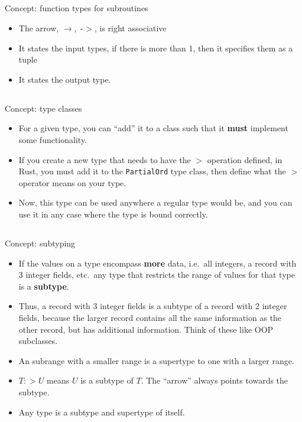 \subsection{}
Concept: function types for subroutines

\begin{itemize}[noitemsep]
\item The arrow, $\rightarrow$, \texttt{-$>$}, is right associative
\item It states the input types, if there is more than 1, then it specifies them as a tuple
\item It states the output type.
\end{itemize}

\subsection{}\label{subsec:Type_Classes}
Concept: type classes

\begin{itemize}[noitemsep]
\item For a given type, you can ``add'' it to a class such that it \textbf{must} implement some functionality.
\item If you create a new type that needs to have the $>$ operation defined, in Rust, you must add it to the \texttt{PartialOrd} type class, then define what the $>$ operator means on your type.
\item Now, this type can be used anywhere a regular type would be, and you can use it in any case where the type is bound correctly.
\end{itemize}

\subsection{}
Concept: subtyping

\begin{itemize}[noitemsep]
\item If the values on a type encompass \textbf{more} data, i.e.\ all integers, a record with 3 integer fields, etc.\ any type that restricts the range of values for that type is a \textbf{subtype}.
\item Thus, a record with 3 integer fields is a subtype of a record with 2 integer fields, because the larger record contains all the same information as the other record, but has additional information. Think of these like OOP subclasses.
\item An subrange with a smaller range is a supertype to one with a larger range.
\item $T :> U$ means $U$ is a subtype of $T$. The ``arrow'' always points towards the subtype.
\item Any type is a subtype and supertype of itself.
\end{itemize}

